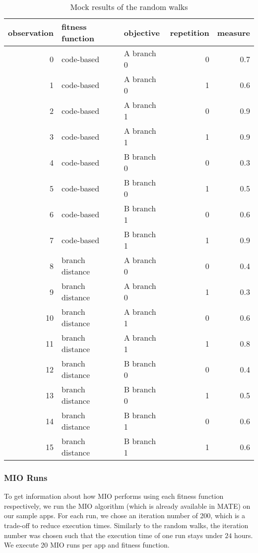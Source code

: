 \begin{table}
	\caption{Mock results of the random walks}\label{table:walks}
	\begin{center}
		\begin{tabular}{rllrr}\toprule
			observation & fitness function & objective & repetition & measure\\
			\midrule
			
			0 & code-based & A branch 0 & 0 & 0.7\\
			1 & code-based & A branch 0 & 1 & 0.6\\
			2 & code-based & A branch 1 & 0 & 0.9\\
			3 & code-based & A branch 1 & 1 & 0.9\\
			
			4 & code-based & B branch 0 & 0 & 0.3\\
			5 & code-based & B branch 0 & 1 & 0.5\\
			6 & code-based & B branch 1 & 0 & 0.6\\
			7 & code-based & B branch 1 & 1 & 0.9\\
			
			8 & branch distance & A branch 0 & 0 & 0.4\\
			9 & branch distance & A branch 0 & 1 & 0.3\\
			10 & branch distance & A branch 1 & 0 & 0.6\\
			11 & branch distance & A branch 1 & 1 & 0.8\\
			
			12 & branch distance & B branch 0 & 0 & 0.4\\
			13 & branch distance & B branch 0 & 1 & 0.5\\
			14 & branch distance & B branch 1 & 0 & 0.6\\
			15 & branch distance & B branch 1 & 1 & 0.6\\
			
			\bottomrule
		\end{tabular}
	\end{center}
\end{table}

\subsubsection{MIO Runs}

To get information about how MIO performs using each fitness function respectively, we run the MIO algorithm (which is already available in MATE) on our sample apps.
For each run, we chose an iteration number of 200, which is a trade-off to reduce execution times.
Similarly to the random walks, the iteration number was chosen such that the execution time of one run stays under $24$ hours.
We execute 20 MIO runs per app and fitness function.

